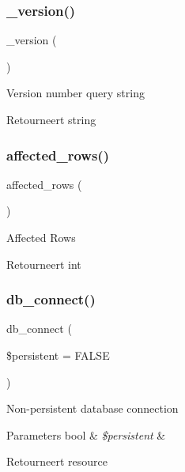 \subsubsection{\texorpdfstring{\_version()}{\_version()}}
{\footnotesize\ttfamily \+\_\+version (\begin{DoxyParamCaption}{ }\end{DoxyParamCaption})\hspace{0.3cm}{\ttfamily [protected]}}

Version number query string

\begin{DoxyReturn}{Retourneert}
string 
\end{DoxyReturn}
\mbox{\label{class_c_i___d_b__mssql__driver_a77248aaad33eb132c04cc4aa3f4bc8cb}} 
\subsubsection{\texorpdfstring{affected\_rows()}{affected\_rows()}}
{\footnotesize\ttfamily affected\+\_\+rows (\begin{DoxyParamCaption}{ }\end{DoxyParamCaption})}

Affected Rows

\begin{DoxyReturn}{Retourneert}
int 
\end{DoxyReturn}
\mbox{\label{class_c_i___d_b__mssql__driver_a52bf595e79e96cc0a7c907a9b45aeb4d}} 
\subsubsection{\texorpdfstring{db\_connect()}{db\_connect()}}
{\footnotesize\ttfamily db\+\_\+connect (\begin{DoxyParamCaption}\item[{}]{\$persistent = {\ttfamily FALSE} }\end{DoxyParamCaption})}

Non-\/persistent database connection


\begin{DoxyParams}[1]{Parameters}
bool & {\em \$persistent} & \\
\hline
\end{DoxyParams}
\begin{DoxyReturn}{Retourneert}
resource 
\end{DoxyReturn}
\mbox{\label{class_c_i___d_b__mssql__driver_a18ae9c21870b30b45337c5e3626190cc}} 
